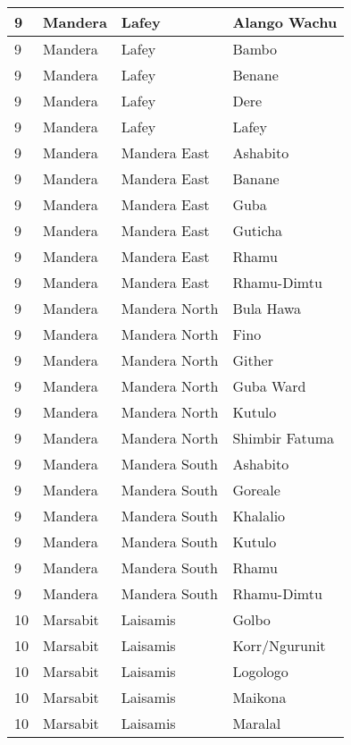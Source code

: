 \begin{table}[!ht]
\begin{tabular}{|l|l|l|l|}
        9 & Mandera & Lafey & Alango Wachu \\ \hline
        9 & Mandera & Lafey & Bambo \\ \hline
        9 & Mandera & Lafey & Benane \\ \hline
        9 & Mandera & Lafey & Dere \\ \hline
        9 & Mandera & Lafey & Lafey \\ \hline
        9 & Mandera & Mandera East & Ashabito \\ \hline
        9 & Mandera & Mandera East & Banane \\ \hline
        9 & Mandera & Mandera East & Guba \\ \hline
        9 & Mandera & Mandera East & Guticha \\ \hline
        9 & Mandera & Mandera East & Rhamu \\ \hline
        9 & Mandera & Mandera East & Rhamu-Dimtu \\ \hline
        9 & Mandera & Mandera North & Bula Hawa \\ \hline
        9 & Mandera & Mandera North & Fino \\ \hline
        9 & Mandera & Mandera North & Gither \\ \hline
        9 & Mandera & Mandera North & Guba Ward \\ \hline
        9 & Mandera & Mandera North & Kutulo \\ \hline
        9 & Mandera & Mandera North & Shimbir Fatuma \\ \hline
        9 & Mandera & Mandera South & Ashabito \\ \hline
        9 & Mandera & Mandera South & Goreale \\ \hline
        9 & Mandera & Mandera South & Khalalio \\ \hline
        9 & Mandera & Mandera South & Kutulo \\ \hline
        9 & Mandera & Mandera South & Rhamu \\ \hline
        9 & Mandera & Mandera South & Rhamu-Dimtu \\ \hline
        10 & Marsabit & Laisamis & Golbo \\ \hline
        10 & Marsabit & Laisamis & Korr/Ngurunit \\ \hline
        10 & Marsabit & Laisamis & Logologo \\ \hline
        10 & Marsabit & Laisamis & Maikona \\ \hline
        10 & Marsabit & Laisamis & Maralal \\ \hline

\end{tabular}
\end{table}
